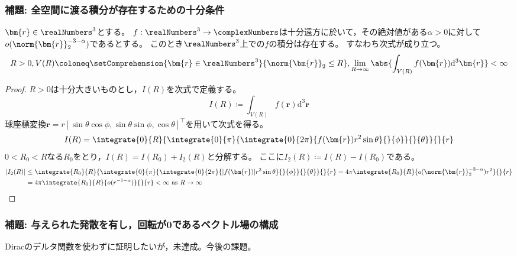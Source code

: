             \subsubsection{補題: 全空間に渡る積分が存在するための十分条件}
                \label{全空間に渡る積分が存在するための十分条件}
                \begin{shadebox}
                    $\bm{r}\in\realNumbers^3$とする。
                    $f:\realNumbers^3\to\complexNumbers$は十分遠方に於いて，その絶対値がある$\alpha>0$に対して$o(\norm{\bm{r}}_2^{-3-\alpha})$であるとする。
                    このとき$\realNumbers^3$上での$f$の積分は存在する。
                    すなわち次式が成り立つ。
                    \[ R>0, V(R) \coloneq \setComprehension{\bm{r}\in\realNumbers^3}{\norm{\bm{r}}_2 \leq R} ,\lim_{R\to\infty} \abs{\int_{V(R)} f(\bm{r}) \mathrm{d}^3\bm{r}} < \infty \]
                \end{shadebox}
                \begin{proof}
                    \quad\par
                    $R>0$は十分大きいものとし，$I(R)$を次式で定義する。
                    \[ I(R) \coloneq \int_{V(R)} f(\bm{r}) \mathrm{d}^3\bm{r} \]
                    球座標変換$\bm{r} = r[\sin\theta\cos\phi,\sin\theta\sin\phi,\cos\theta]^\top$を用いて次式を得る。
                    \[ I(R) = \integrate{0}{R}{\integrate{0}{\pi}{\integrate{0}{2\pi}{f(\bm{r})r^2\sin\theta}{}{\phi}}{}{\theta}}{}{r} \]
                    $0<R_0<R$なる$R_0$をとり，$I(R) = I(R_0) + I_2(R)$と分解する。
                    ここに$I_2(R) \coloneq I(R) - I(R_0)$である。
                    \begin{align*}
                        |I_2(R)| &\leq \integrate{R_0}{R}{\integrate{0}{\pi}{\integrate{0}{2\pi}{|f(\bm{r})|r^2\sin\theta}{}{\phi}}{}{\theta}}{}{r} = 4\pi\integrate{R_0}{R}{o(\norm{\bm{r}}_2^{-3-\alpha})r^2}{}{r} \\
                        &= 4\pi\integrate{R_0}{R}{o(r^{-1-\alpha})}{}{r} < \infty \text{ as } R\to\infty
                    \end{align*}
                \end{proof}
            \subsubsection{補題: 与えられた発散を有し，回転が\texorpdfstring{$\bm{0}$}{0}であるベクトル場の構成}
                \label{与えられた発散を有し，回転が無いベクトル場の構成}
                Diracのデルタ関数を使わずに証明したいが，未達成。今後の課題。
